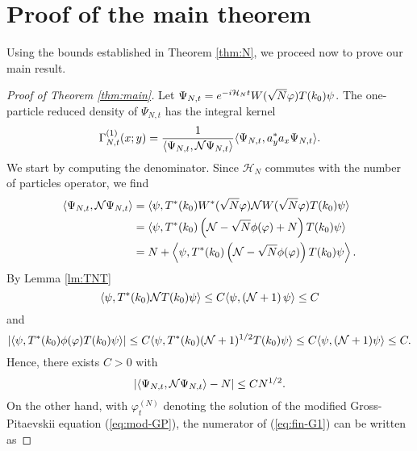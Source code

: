 \documentclass[11pt,a4paper]{article}
\newcommand{\cH}{{\cal H}}
\newcommand{\cN}{{\cal N}}
\newcommand{\Hcal}{\mathcal{H}}		%
\begin{document}
%
%

\section{Proof of the main theorem}

Using the bounds established in Theorem \ref{thm:N}, we proceed now to prove our main result.

\begin{proof}[Proof of Theorem \ref{thm:main}]
Let $\Psi_{N,t} = e^{-i\cH_N t} W(\sqrt{N} \varphi) T(k_0) \psi$. The one-particle reduced density of $\Psi_{N,t}$ has the integral kernel
\begin{equation}\label{eq:fin-G1} \Gamma_{N,t}^{(1)} (x;y) = \frac{1}{\langle \Psi_{N,t} , \cN \Psi_{N,t} \rangle} \langle \Psi_{N,t} , a_y^* a_x \Psi_{N,t} \rangle. \end{equation}
We start by computing the denominator. Since $\Hcal_N$ commutes with the number of particles operator, we find
\[ \begin{split} 
\langle \Psi_{N,t} , \cN \Psi_{N,t} \rangle = \; &\langle \psi,T^* (k_0) W^*
(\sqrt{N} \varphi) \cN W (\sqrt{N} \varphi)  T(k_0) \psi\rangle  \\ = \;
&\langle \psi, T^* (k_0) \left( \cN - \sqrt{N} \phi (\varphi) + N \right)
T(k_0) \psi \rangle \\ = \; &N + \left\langle \psi,  T^* (k_0) \left(\cN -
\sqrt{N} \phi(\varphi) \right) T(k_0) \psi \right\rangle. \end{split} \]
By Lemma \ref{lm:TNT}
\[  \langle \psi , T^* (k_0) \cN T(k_0) \psi \rangle \leq C \langle \psi , (\cN+1) \, \psi \rangle \leq C \]
and 
\[ \left| \langle \psi , T^*(k_0) \phi (\varphi) T(k_0) \psi \rangle \right| \leq C \langle \psi, T^* (k_0) (\cN+1)^{1/2} T(k_0) \psi \rangle \leq C \langle \psi , (\cN+1) \psi \rangle \leq C. \]
Hence, there exists $C>0$ with
\begin{equation}\label{eq:fin-G2} \left| \langle \Psi_{N,t} , \cN \Psi_{N,t} \rangle - N \right| \leq C N^{1/2}. \end{equation}
On the other hand, with $\varphi^{(N)}_t$ denoting the solution of the modified Gross-Pitaevskii equation (\ref{eq:mod-GP}), the numerator of (\ref{eq:fin-G1}) can be written as  

\end{proof}
\end{document}
